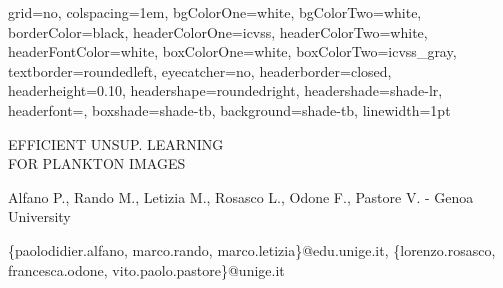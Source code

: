 \documentclass[ICVSS,portrait,final]{baposter}
\begin{document}
\begin{poster}%
  {
  grid=no,
  colspacing=1em,
  bgColorOne=white,
    bgColorTwo=white,
  borderColor=black,
    headerColorOne=icvss,
  headerColorTwo=white,
    headerFontColor=white,
  boxColorOne=white,
  boxColorTwo=icvss_gray,
  textborder=roundedleft,
  eyecatcher=no,
  headerborder=closed,
  headerheight=0.10\textheight,
  headershape=roundedright,
    headershade=shade-lr,
  headerfont=\Large\textsf, %
    boxshade=shade-tb,
  background=shade-tb,
  linewidth=1pt
  }

  {\sf %
  \vspace{1.5em}
  EFFICIENT UNSUP. LEARNING\\FOR PLANKTON IMAGES
  }
  {\sf %
  \begin{normalsize}
  	Alfano P., Rando M., Letizia M., Rosasco L., Odone F., Pastore V. - Genoa University
  
  \end{normalsize}
	\begin{footnotesize}
		\{paolodidier.alfano, marco.rando, marco.letizia\}@edu.unige.it, \{lorenzo.rosasco, francesca.odone, vito.paolo.pastore\}@unige.it\\ \\
	\end{footnotesize}
  }
  {%
  }


\end{poster}
\end{document}
